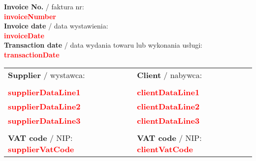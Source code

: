 \documentclass{article}
\newcommand{\VAR}[1]{
    \textbf{\textcolor{red}{#1}}
}
\begin{document}
    \newpage

    \begin{flushright}
        \textbf{Invoice No.} / faktura nr: \\
        \VAR{invoiceNumber} \\
        \vspace{0.5em}
        \textbf{Invoice date} / data wystawienia: \\
        \VAR{invoiceDate} \\
        \vspace{0.5em}
        \textbf{Transaction date} / data wydania towaru lub wykonania usługi: \\
        \VAR{transactionDate} \\
    \end{flushright}

    \vspace{1em}

    \begin{center}
        \begin{tabular}{l l}
        \textbf{Supplier} / wystawca: & \textbf{Client} / nabywca: \\
        \\
        \VAR{supplierDataLine1} & \VAR{clientDataLine1} \\
        \VAR{supplierDataLine2} & \VAR{clientDataLine2} \\
        \VAR{supplierDataLine3} & \VAR{clientDataLine3} \\
        \\
        \textbf{VAT code} / NIP: \VAR{supplierVatCode} & \textbf{VAT code} / NIP: \VAR{clientVatCode}
        \end{tabular}
    \end{center}


\end{document}
